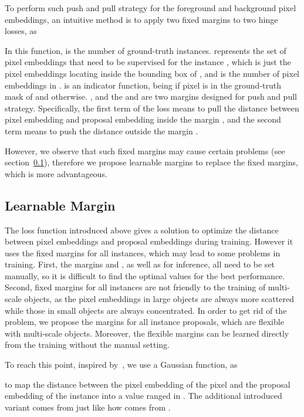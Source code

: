\documentclass[10pt,twocolumn,letterpaper]{article}
\begin{document}
To perform such push and pull strategy for the foreground and background pixel embeddings, an intuitive method is to apply two fixed margins to two hinge losses, as 

In this function,  is the number of ground-truth instances.
 represents the set of pixel embeddings that need to be supervised for the instance , which is just the pixel embeddings locating inside the bounding box of , and  is the number of pixel embeddings in . 
 is an indicator function, being  if pixel  is in the ground-truth mask of  and  otherwise. 
, and the  and  are two margins designed for push and pull strategy. 
Specifically, the first term of the loss means to pull the distance between pixel embedding  and proposal embedding  inside the margin , and the second term means to push the distance outside the margin . 


However, we observe that such fixed margins may cause certain problems (see section~\ref{sec:learn_margin}), therefore we propose learnable margins to replace the fixed margins, which is more advantageous.

\subsection{Learnable Margin} \label{sec:learn_margin}

The loss function introduced above gives a solution to optimize the distance between pixel embeddings and proposal embeddings during training. 
However it uses the fixed margins for all instances, which may lead to some problems in training. 
First, the margins  and , as well as  for inference, all need to be set manually, so it is difficult to find the optimal values for the best performance. 
Second, fixed margins for all instances are not friendly to the training of multi-scale objects, as the pixel embeddings in large objects are always more scattered while those in small objects are always concentrated.
In order to get rid of the problem, we propose the margins  for all instance proposals, which are flexible with multi-scale objects. 
Moreover, the flexible margins  can be learned directly from the training without the manual setting. 

To reach this point, inspired by~\cite{neven2019instance}, we use a Gaussian function, as

to map the distance between the pixel embedding  of the pixel  and the proposal embedding  of the instance  into a value ranged in . 
The additional introduced variant  comes from  just like how  comes from . 
\end{document}
